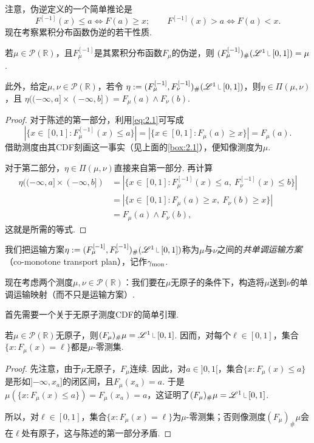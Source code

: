 注意，伪逆定义的一个简单推论是
\begin{equation}\label{eq:2.1}
F^{[-1]}(x)\le a\iff F(a)\ge x;
\qquad F^{[-1]}(x)>a\iff F(a)<x.
\end{equation}
现在考察累积分布函数伪逆的若干性质.

\begin{proposition}\label{obj:2.2}
若$\mu\in\mathscr P(\mathbb R)$，且$F_\mu^{[-1]}$是其累积分布函数$F_\mu$的伪逆，则
$(F_\mu^{[-1]})_\#(\mathscr L^1\restr[0,1])=\mu$.

此外，给定$\mu,\nu\in\mathscr P(\mathbb R)$，若令
$\eta:=(F_\mu^{[-1]},F_\nu^{[-1]})_\#(\mathscr L^1\restr[0,1])$，则$\eta\in\Pi(\mu,\nu)$，且
$\eta(({-\infty},a]\times({-\infty},b])=F_\mu(a)\wedge F_\nu(b)$.
\end{proposition}
\begin{proof}
对于陈述的第一部分，利用\eqref{eq:2.1}可写成
\[
|\{x\in[0,1]:F_\mu^{[-1]}(x)\le a\}|
=|\{x\in[0,1]:F_\mu(a)\ge x\}|=F_\mu(a).
\]
借助测度由其CDF刻画这一事实（见上面的\autoref{box:2.1}），便知像测度为$\mu$.

对于第二部分，$\eta\in\Pi(\mu,\nu)$直接来自第一部分. 再计算
\[
\begin{aligned}
\eta(({-\infty},a]\times({-\infty},b])
&=|\{x\in[0,1]:F_\mu^{[-1]}(x)\le a,\ F_\nu^{[-1]}(x)\le b\}|\\
&=|\{x\in[0,1]:F_\mu(a)\ge x,\ F_\nu(b)\ge x\}|\\
&=F_\mu(a)\wedge F_\nu(b),
\end{aligned}
\]
这就是所需的等式.
\end{proof}

\begin{definition}\label{obj:2.3}
我们把运输方案$\eta:=(F_\mu^{[-1]},F_\nu^{[-1]})_\#(\mathscr L^1\restr[0,1])$称为$\mu$与$\nu$之间的\emph{共单调运输方案}（co-monotone transport plan），记作$\gamma_{\rm mon}$.
\end{definition}

现在考虑两个测度$\mu,\nu\in\mathscr P(\mathbb R)$：我们要在$\mu$无原子的条件下，构造将$\mu$送到$\nu$的单调运输映射（而不只是运输方案）.

首先需要一个关于无原子测度CDF的简单引理.

\begin{lemma}\label{obj:2.4}
若$\mu\in\mathscr P(\mathbb R)$无原子，则$(F_\mu)_\#\mu=\mathscr L^1\restr[0,1]$. 因而，对每个$\ell\in[0,1]$，集合$\{x:F_\mu(x)=\ell\}$都是$\mu$-零测集.
\end{lemma}
\begin{proof}
先注意，由于$\mu$无原子，$F_\mu$连续. 因此，对$a\in]0,1[$，集合$\{x:F_\mu(x)\le a\}$是形如$]{-\infty},x_a]$的闭区间，且$F_\mu(x_a)=a$. 于是
$\mu(\{x:F_\mu(x)\le a\})=F_\mu(x_a)=a$，这证明了$(F_\mu)_\#\mu=\mathscr L^1\restr[0,1]$.

所以，对$\ell\in[0,1]$，集合$\{x:F_\mu(x)=\ell\}$为$\mu$-零测集；否则像测度$(F_\mu)_\#\mu$会在$\ell$处有原子，这与陈述的第一部分矛盾.
\end{proof}

